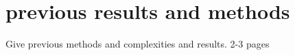 \section{previous results and methods}
Give previous methods and complexities and results. 2-3 pages